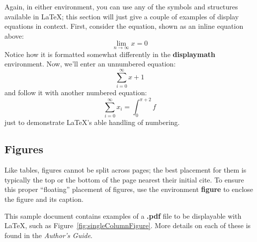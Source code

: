 \documentclass[sigplan,screen,nonacm]{acmart}
\begin{document}
Again, in either environment, you can use any of the symbols and
structures available in \LaTeX\@; this section will just give a couple
of examples of display equations in context.  First, consider the
equation, shown as an inline equation above:
\begin{equation}
  \lim_{n\rightarrow \infty}x=0
\end{equation}
Notice how it is formatted somewhat differently in
the \textbf{displaymath}
environment.  Now, we'll enter an unnumbered equation:
\begin{displaymath}
  \sum_{i=0}^{\infty} x + 1
\end{displaymath}
and follow it with another numbered equation:
\begin{equation}
  \sum_{i=0}^{\infty}x_i=\int_{0}^{\pi+2} f
\end{equation}
just to demonstrate \LaTeX's able handling of numbering.





\subsection{Figures}
\label{sec:figures}

Like tables, figures cannot be split across pages; the
best placement for them
is typically the top or the bottom of the page nearest
their initial cite.  To ensure this proper ``floating'' placement
of figures, use the environment
\textbf{figure} to enclose the figure and its caption.

This sample document contains examples of
a \textbf{.pdf} file to be displayable with \LaTeX, such as
Figure~\ref{fig:singleColumnFigure}.  More
details on each of these is found in the \textit{Author's Guide}.
\end{document}
